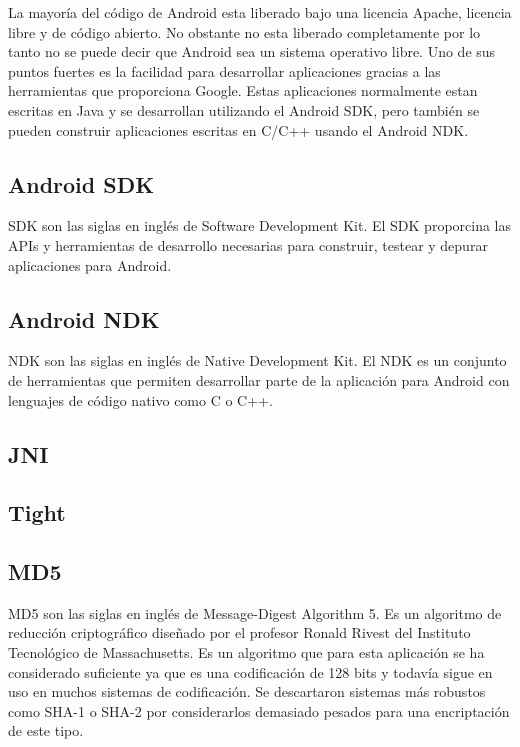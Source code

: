 La mayoría del código de Android esta liberado bajo una licencia Apache, licencia libre y de código abierto. No obstante no esta liberado completamente por lo tanto no se puede decir que Android sea un sistema operativo libre. Uno de sus puntos fuertes es la facilidad para desarrollar aplicaciones gracias a las herramientas que proporciona Google. Estas aplicaciones normalmente estan escritas en Java y se desarrollan utilizando el Android SDK, pero también se pueden construir aplicaciones escritas en C/C++ usando el Android NDK.\\

\subsection{Android SDK}

SDK son las siglas en inglés de Software Development Kit. El SDK proporcina las APIs y herramientas de desarrollo necesarias para construir, testear y depurar aplicaciones para Android.\\

\subsection{Android NDK}

NDK son las siglas en inglés de Native Development Kit. El NDK es un conjunto de herramientas que permiten desarrollar parte de la aplicación para Android con lenguajes de código nativo como C o C++.\\

\subsection{JNI}

\subsection{Tight}

\subsection{MD5}

MD5 son las siglas en inglés de Message-Digest Algorithm 5. Es un algoritmo de reducción criptográfico diseñado por el profesor Ronald Rivest del Instituto Tecnológico de Massachusetts. Es un algoritmo que para esta aplicación se ha considerado suficiente ya que es una codificación de 128 bits y todavía sigue en uso en muchos sistemas de codificación. Se descartaron sistemas más robustos como SHA-1 o SHA-2 por considerarlos demasiado pesados para una encriptación de este tipo.

